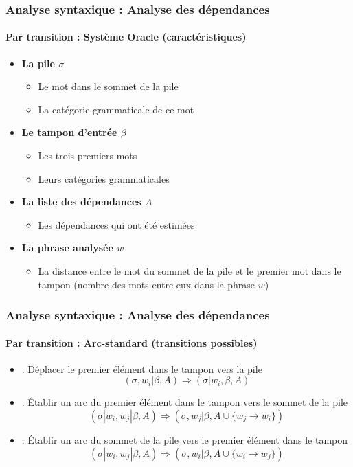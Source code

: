 \documentclass[xcolor=table]{beamer}
\begin{document}
\begin{frame}
\frametitle{Analyse syntaxique : Analyse des dépendances}
\framesubtitle{Par transition : Système Oracle (caractéristiques)}

\begin{itemize}
	\item \textbf{La pile $\sigma$}
	\begin{itemize}
		\item Le mot dans le sommet de la pile
		\item La catégorie grammaticale de ce mot
	\end{itemize}

	\item \textbf{Le tampon d'entrée $\beta$}
	\begin{itemize}
		\item Les trois premiers mots
		\item Leurs catégories grammaticales
	\end{itemize}

	\item \textbf{La liste des dépendances $A$}
	\begin{itemize}
		\item Les dépendances qui ont été estimées
	\end{itemize}

	\item \textbf{La phrase analysée $w$}
	\begin{itemize}
		\item La distance entre le mot du sommet de la pile et le premier mot dans le tampon (nombre des mots entre eux dans la phrase $w$)
	\end{itemize}

\end{itemize}

\end{frame}

\begin{frame}
\frametitle{Analyse syntaxique : Analyse des dépendances}
\framesubtitle{Par transition : Arc-standard (transitions possibles)}

\begin{itemize}
	\item {} : Déplacer le premier élément dans le tampon vers la pile 
	\[ (\sigma, w_i|\beta, A) \Rightarrow  (\sigma|w_i, \beta, A) \]
	
	\item {} : Établir un arc du premier élément dans le tampon vers le sommet de la pile
	\[ (\sigma|w_i, w_j|\beta, A) \Rightarrow  (\sigma, w_j|\beta, A \cup \{w_j \rightarrow w_i \}) \] 
	
	\item {} : Établir un arc du sommet de la pile vers le premier élément dans le tampon
	\[ (\sigma|w_i, w_j|\beta, A) \Rightarrow  (\sigma, w_i|\beta, A \cup \{w_i \rightarrow w_j \}) \] 
\end{itemize}

\end{frame}
\end{document}
